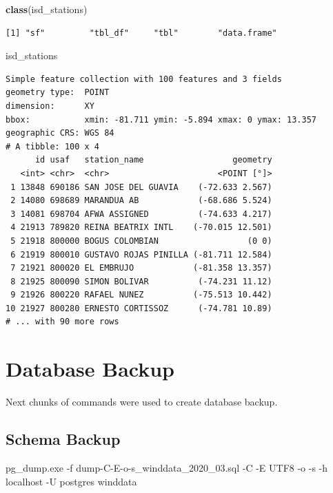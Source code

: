 \documentclass[12pt,oneside]{reedthesis}
\newenvironment{Shaded}{\begin{snugshade}}{\end{snugshade}}
\newcommand{\ExtensionTok}[1]{#1}
\newcommand{\KeywordTok}[1]{\textcolor[rgb]{0.13,0.29,0.53}{\textbf{#1}}}
\newcommand{\NormalTok}[1]{#1}
\begin{document}
\vspace{0.4cm}
\begin{Shaded}
\begin{Highlighting}[]
        \KeywordTok{class}\NormalTok{(isd_stations)}
\end{Highlighting}
\end{Shaded}
\begin{verbatim}
[1] "sf"         "tbl_df"     "tbl"        "data.frame"
\end{verbatim}
\vspace{0.4cm}
\begin{Shaded}
\begin{Highlighting}[]
\NormalTok{        isd_stations}
\end{Highlighting}
\end{Shaded}
\begin{verbatim}
Simple feature collection with 100 features and 3 fields
geometry type:  POINT
dimension:      XY
bbox:           xmin: -81.711 ymin: -5.894 xmax: 0 ymax: 13.357
geographic CRS: WGS 84
# A tibble: 100 x 4
      id usaf   station_name                  geometry
   <int> <chr>  <chr>                      <POINT [°]>
 1 13848 690186 SAN JOSE DEL GUAVIA    (-72.633 2.567)
 2 14080 698689 MARANDUA AB            (-68.686 5.524)
 3 14081 698704 AFWA ASSIGNED          (-74.633 4.217)
 4 21913 789820 REINA BEATRIX INTL    (-70.015 12.501)
 5 21918 800000 BOGUS COLOMBIAN                  (0 0)
 6 21919 800010 GUSTAVO ROJAS PINILLA (-81.711 12.584)
 7 21921 800020 EL EMBRUJO            (-81.358 13.357)
 8 21925 800090 SIMON BOLIVAR          (-74.231 11.12)
 9 21926 800220 RAFAEL NUNEZ          (-75.513 10.442)
10 21927 800280 ERNESTO CORTISSOZ      (-74.781 10.89)
# ... with 90 more rows
\end{verbatim}
\normalsize

\hypertarget{database-backup}{%
\section{Database Backup}\label{database-backup}}

Next chunks of commands were used to create database backup.

\hypertarget{schema-backup}{%
\subsection{Schema Backup}\label{schema-backup}}

\scriptsize

\vspace{0.4cm}
\begin{Shaded}
\begin{Highlighting}[]
      \ExtensionTok{pg_dump.exe}\NormalTok{ -f dump-C-E-o-s_winddata_2020_03.sql -C -E UTF8 -o -s -h localhost -U postgres winddata}
\end{Highlighting}
\end{Shaded}
\normalsize
\end{document}
